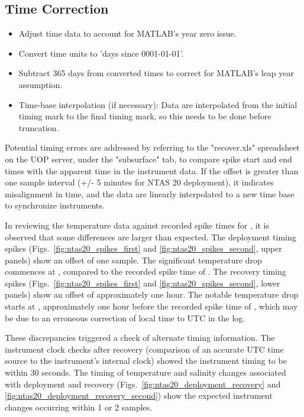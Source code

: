 \subsection{Time Correction}
\begin{itemize}
\item Adjust time data to account for MATLAB's year zero issue.
\item Convert time units to 'days since 0001-01-01'.
\item Subtract 365 days from converted times to correct for MATLAB's leap year assumption.
\item Time-base interpolation (if necessary): Data are interpolated from the initial timing mark to the final timing mark, 
so this needs to be done before truncation.
\end{itemize}

Potential timing errors are addressed by referring to the "recover.xls" spreadsheet on the UOP server, 
under the "subsurface" tab, to compare spike start and end times with the apparent time in the instrument data. 
If the offset is greater than one sample interval (+/- 5 minutes for NTAS 20 deployment), 
it indicates misalignment in time, and the data are linearly interpolated to a new time base to synchronize instruments.


In reviewing the temperature data against recorded spike times for \projectname{} \casenumber{}, it is observed
that some differences are larger than expected. The deployment timing spikes
(Figs.~\ref{fig:ntas20_spikes_first} and \ref{fig:ntas20_spikes_second}, upper panels) show an offset of one sample.
The significant temperature drop commences at \DeploymentSpike{}, compared to the recorded spike time of
\DeploymentRecordedSpike{}. The recovery timing spikes (Figs.~\ref{fig:ntas20_spikes_first} and \ref{fig:ntas20_spikes_second},
lower panels) show an offset of approximately one hour. The notable temperature drop starts at \RecoverySpike{},
approximately one hour before the recorded spike time of \RecoveryRecordedSpike{}, which may be due to an
erroneous correction of local time to UTC in the log.

These discrepancies triggered a check of alternate timing information. The instrument clock checks after
recovery (comparison of an accurate UTC time source to the instrument's internal clock) showed the instrument
timing to be within 30 seconds. The timing of temperature and salinity changes associated with deployment
and recovery (Figs.~\ref{fig:ntas20_deployment_recovery} and \ref{fig:ntas20_deployment_recovery_second}) show the expected
instrument changes occurring within 1 or 2 samples.

